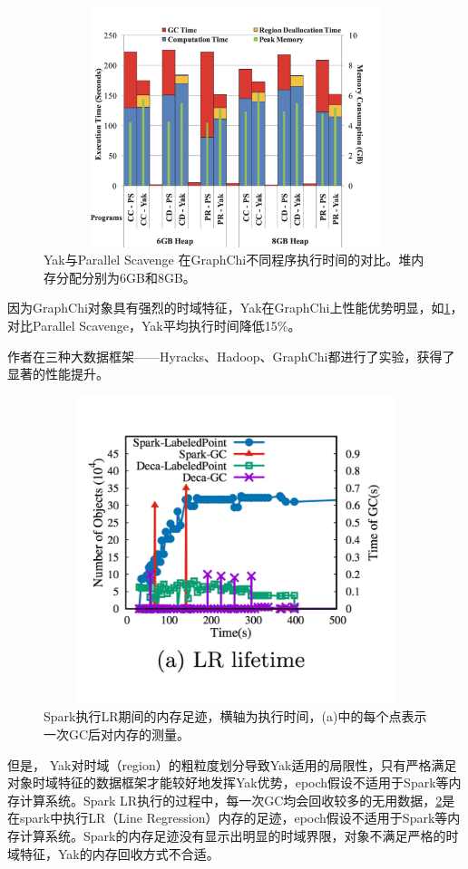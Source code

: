 \begin{figure}[h]
    \centering
    \includegraphics[width=12cm,height=7cm]{figure/evaluation1.jpg}
    \caption{
        Yak与Parallel Scavenge 在GraphChi不同程序执行时间的对比。堆内存分配分别为6GB和8GB。
    }
    \label{evaluation1}
\end{figure}

因为GraphChi对象具有强烈的时域特征，Yak在GraphChi上性能优势明显，如\ref{evaluation1}，对比Parallel Scavenge，Yak平均执行时间降低15\%。

作者在三种大数据框架——Hyracks、Hadoop、GraphChi都进行了实验，获得了显著的性能提升。

\begin{figure}[h]
    \centering
    \includegraphics[width=12cm,height=9cm]{figure/evaluation2.png}
    \caption{
        Spark执行LR期间的内存足迹，横轴为执行时间，(a)中的每个点表示一次GC后对内存的测量。
    }
    \label{evaluation2}
\end{figure}
但是， Yak对时域（region）的粗粒度划分导致Yak适用的局限性，只有严格满足对象时域特征的数据框架才能较好地发挥Yak优势，epoch假设不适用于Spark等内存计算系统。Spark LR执行的过程中，每一次GC均会回收较多的无用数据，\ref{evaluation2}是在spark中执行LR（Line Regression）内存的足迹，epoch假设不适用于Spark等内存计算系统。Spark的内存足迹没有显示出明显的时域界限，对象不满足严格的时域特征，Yak的内存回收方式不合适。

